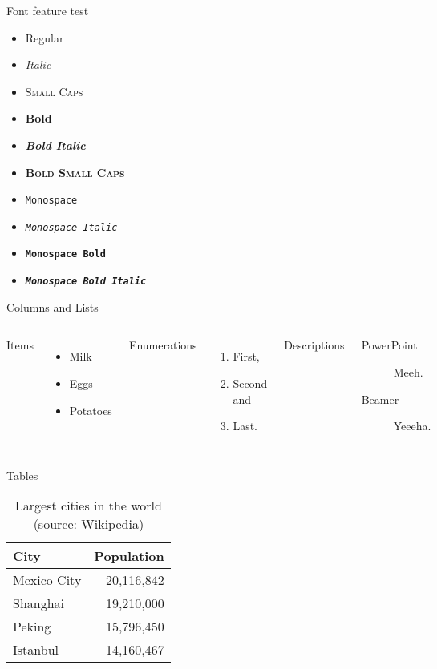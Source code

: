 \begin{frame}{Font feature test}
  \begin{itemize}
    \item Regular
    \item \textit{Italic}
    \item \textsc{Small Caps}
    \item \textbf{Bold}
    \item \textbf{\textit{Bold Italic}}
    \item \textbf{\textsc{Bold Small Caps}}
    \item \texttt{Monospace}
    \item \texttt{\textit{Monospace Italic}}
    \item \texttt{\textbf{Monospace Bold}}
    \item \texttt{\textbf{\textit{Monospace Bold Italic}}}
  \end{itemize}
\end{frame}

\begin{frame}{Columns and Lists}
  \begin{columns}[T,onlytextwidth]
      Items
      \begin{itemize}
        \item Milk \item Eggs \item Potatoes
      \end{itemize}

      Enumerations
      \begin{enumerate}
        \item First, \item Second and \item Last.
      \end{enumerate}

      Descriptions
      \begin{description}
        \item[PowerPoint] Meeh. \item[Beamer] Yeeeha.
      \end{description}
  \end{columns}
\end{frame}

\begin{frame}{Tables}
  \begin{table}
    \caption{Largest cities in the world (source: Wikipedia)}
    \begin{tabular}{@{} lr @{}}
      \toprule
      City & Population\\
      \midrule
      Mexico City & 20,116,842\\
      Shanghai & 19,210,000\\
      Peking & 15,796,450\\
      Istanbul & 14,160,467\\
      \bottomrule
    \end{tabular}
  \end{table}
\end{frame}


